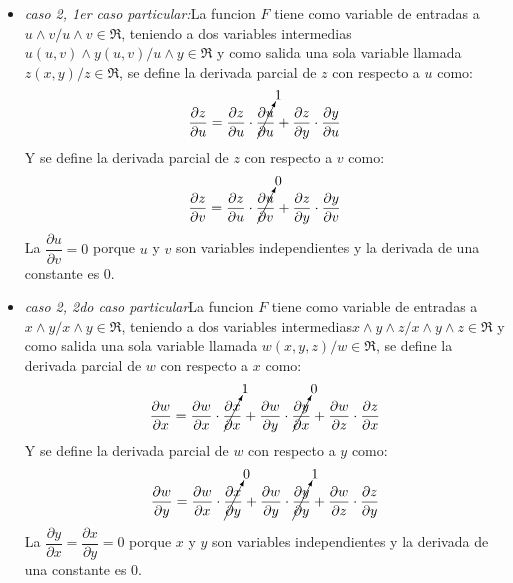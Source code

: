 \documentclass[12pt,a4paper]{article}
\begin{document}
\begin{itemize}
    \item \textit{caso 2, 1er caso particular:}La funcion $F$ tiene como variable de entradas a $u\wedge v/u \wedge v \in \Re$, teniendo a dos variables intermedias$u(u,v)\wedge y(u,v)/ u\wedge y \in \Re$ y como salida una sola variable llamada $z(x,y)/z \in \Re$, se define la derivada parcial de $z$ con respecto a $u$ como:
    $$ \dfrac{\partial z}{\partial u} =\dfrac{\partial z}{\partial u} \cdot \cancelto{1}{\dfrac{\partial u}{\partial u}}+\dfrac{\partial z}{\partial y}\cdot \dfrac{\partial y}{\partial u}$$
    Y se define la derivada parcial de $z$ con respecto a $v$ como:
   $$ \dfrac{\partial z}{\partial v} =\dfrac{\partial z}{\partial u} \cdot \cancelto{0}{\dfrac{\partial u}{\partial v}}+\dfrac{\partial z}{\partial y}\cdot \dfrac{\partial y}{\partial v}$$
   La $\dfrac{\partial u}{\partial v}=0 $ porque $u$ y $v$ son variables independientes y la derivada de una constante es 0.\\
   \item \textit{caso 2, 2do caso particular}La funcion $F$ tiene como variable de entradas a $x\wedge y/x \wedge y \in \Re$, teniendo a dos variables intermedias$x\wedge y\wedge z/ x\wedge y \wedge z \in \Re$ y como salida una sola variable llamada $w(x,y,z)/w \in \Re$, se define la derivada parcial de $w$ con respecto a $x$ como:
   $$ \dfrac{\partial w}{\partial x} =\dfrac{\partial w}{\partial x} \cdot \cancelto{1}{\dfrac{\partial x}{\partial x}}+\dfrac{\partial w}{\partial y}\cdot \cancelto{0}{\dfrac{\partial y}{\partial x}} +\dfrac{\partial w}{\partial z}\cdot \dfrac{\partial z}{\partial x}$$
   Y se define la derivada parcial de $w$ con respecto a $y$ como:
  $$ \dfrac{\partial w}{\partial y} =\dfrac{\partial w}{\partial x} \cdot \cancelto{0}{\dfrac{\partial x}{\partial y}}+\dfrac{\partial w}{\partial y}\cdot \cancelto{1}{\dfrac{\partial y}{\partial y}}+\dfrac{\partial w}{\partial z}\cdot \dfrac{\partial z}{\partial y}$$
  La $\dfrac{\partial y}{\partial x}= \dfrac{\partial x}{\partial y}=0 $ porque $x$ y $y$ son variables independientes y la derivada de una constante es 0.\\
\end{itemize}
\end{document}

